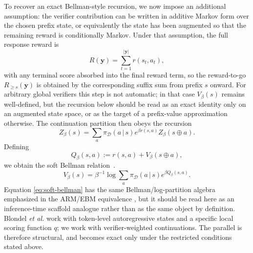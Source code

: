 \documentclass[aps,pre,reprint,superscriptaddress,nofootinbib]{revtex4-2}
\newcommand{\given}{\,|\,}
\newcommand{\y}{\mathbf{y}}
\begin{document}
To recover an exact Bellman-style recursion, we now impose an additional assumption: the verifier contribution can be written in additive Markov form over the chosen prefix state, or equivalently the state has been augmented so that the remaining reward is conditionally Markov.
Under that assumption, the full response reward is
\begin{equation}
R(\y)=\sum_{t=1}^{|\y|} r(s_t,a_t),
\label{eq:additive-reward}
\end{equation}
with any terminal score absorbed into the final reward term, so the reward-to-go $R_{\ge s}(\y)$ is obtained by the corresponding suffix sum from prefix $s$ onward.
For arbitrary global verifiers this step is not automatic; in that case $V_\beta(s)$ remains well-defined, but the recursion below should be read as an exact identity only on an augmented state space, or as the target of a prefix-value approximation otherwise.
The continuation partition then obeys the recursion
\begin{equation}
Z_\beta(s)=\sum_{a}\pi_{\mathcal D}(a\given s)e^{\beta r(s,a)}Z_\beta(s\oplus a).
\label{eq:partition-recursion}
\end{equation}
Defining
\begin{equation}
Q_\beta(s,a):=r(s,a)+V_\beta(s\oplus a),
\label{eq:q-def}
\end{equation}
we obtain the soft Bellman relation~\cite{blondel2025autoregressive,levine2018reinforcement}.
\begin{equation}
V_\beta(s)=\beta^{-1}\log \sum_{a}\pi_{\mathcal D}(a\given s)e^{\beta Q_\beta(s,a)}.
\label{eq:soft-bellman}
\end{equation}
Equation \eqref{eq:soft-bellman} has the same Bellman/log-partition algebra emphasized in the ARM/EBM equivalence \cite{blondel2025autoregressive}, but it should be read here as an inference-time scaffold analogue rather than as the same object by definition.
Blondel \textit{et al.} work with token-level autoregressive states and a specific local scoring function $q$; we work with verifier-weighted continuations.
The parallel is therefore structural, and becomes exact only under the restricted conditions stated above.
\end{document}
